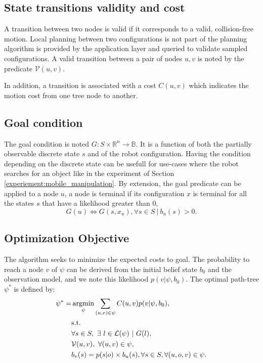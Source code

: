 \documentclass[letterpaper, 10 pt, conference]{ieeeconf}  %
\DeclareMathOperator*{\argmin}{argmin} %
\begin{document}
\subsection{State transitions validity and cost}
A transition between two nodes is valid if it corresponds to a valid, collision-free motion. Local planning between two configurations is not part of the planning algorithm is provided by the application layer and queried to validate sampled configurations. A valid transition between a pair of nodes $u, v$ is noted by the predicate $\mathcal{V}(u, v)$. 

In addition, a transition is associated with a cost $C(u, v)$ which indicates the motion cost from one tree node to another.

\subsection{Goal condition}
The goal condition is noted $G: S \times \mathbb{R}^n \rightarrow \mathbb{B}$. It is a function of both the partially observable discrete state $s$ and of the robot configuration. Having the condition depending on the discrete state can be usefull for use-cases where the robot searches for an object like in the experiment of Section \ref{experiement:mobile_manipulation}.
By extension, the goal predicate can be applied to a node $u$, a node is terminal if its configuration $x$ is terminal for all the states $s$ that have a likelihood greater than 0,
\begin{equation}
G(u) \iff G(s, x_u), \forall s \in S\ |\ b_u(s) > 0.
\end{equation}
 
\subsection{Optimization Objective}

The algorithm seeks to minimize the expected costs to goal. The probability to reach a node $v$ of $\psi$ can be derived from the initial belief state $b_0$ and the observation model, and we note this likelihood $p(v | \psi, b_0)$. 
The optimal path-tree $\psi^*$ is defined by:
\begin{subequations}
\label{eq:optimization_objective}
\begin{align}
\psi^* = &\argmin_{\psi} \sum_{(u, v) \in \psi} C(u, v) p(v | \psi, b_0), \label{eq:cost_min}\\
&\text{s.t.} \notag \\
&\forall s \in S,\ \exists\ l \in \mathcal{L}(\psi) \ |\ G(l), \label{eq:goal_constraint}\\
&\mathcal{V}(u, v), \ \forall (u, v) \in \psi \label{eq:validity}, \\
&b_v(s) = p(s | o) \times b_u(s), \forall s \in S, \forall (u, o, v) \in \psi. \label{eq:belief_dynamic}
\end{align}
\end{subequations}
\end{document}
